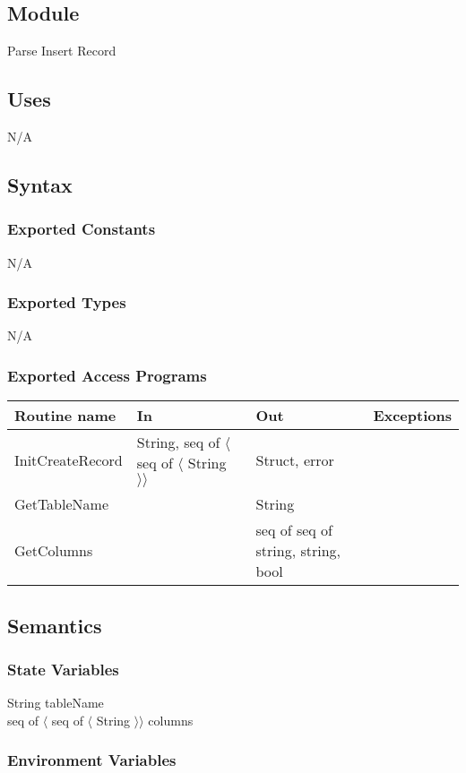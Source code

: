 \documentclass[12pt]{article}
\begin{document}
\subsection{Module}
Parse Insert Record

\subsection{Uses}
N/A

\subsection{Syntax}
\subsubsection{Exported Constants}
N/A

\subsubsection{Exported Types}
N/A

\subsubsection{Exported Access Programs}
\begin{tabular}{| l | l | l | l |}
\hline
\textbf{Routine name} & \textbf{In} & \textbf{Out} & \textbf{Exceptions}\\
\hline
InitCreateRecord & String, seq of $\langle$ seq of $\langle$ String $\rangle \rangle$ & Struct, error &\\
\hline
GetTableName & & String & \\
\hline
GetColumns & & seq of seq of string, string, bool & \\
\hline
\end{tabular}

\subsection{Semantics}
\subsubsection{State Variables}

String tableName \\
seq of $\langle$ seq of $\langle$ String $\rangle \rangle$ columns

\subsubsection{Environment Variables}
\end{document}
